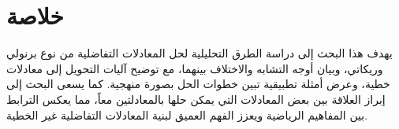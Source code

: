 \chapter*{خلاصة}
يهدف هذا البحث إلى دراسة الطرق التحليلية لحل المعادلات التفاضلية من نوع برنولي وريكاتي، وبيان أوجه التشابه والاختلاف بينهما، مع توضيح آليات التحويل إلى معادلات خطية، وعرض أمثلة تطبيقية تبين خطوات الحل بصورة منهجية. كما يسعى البحث إلى إبراز العلاقة بين بعض المعادلات التي يمكن حلها بالمعادلتين معاً، مما يعكس الترابط بين المفاهيم الرياضية ويعزز الفهم العميق لبنية المعادلات التفاضلية غير الخطية.